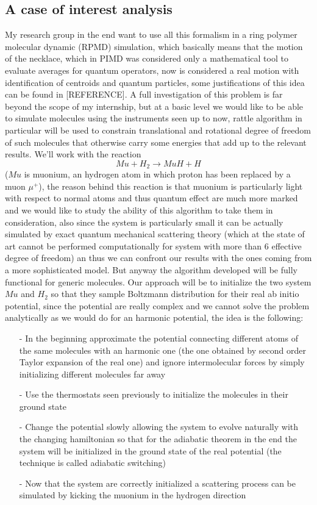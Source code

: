 \documentclass[10pt,a4paper]{article}
\begin{document}
\subsection{A case of interest analysis}
My research group in the end want to use all this formalism in a ring polymer molecular dynamic (RPMD) simulation, which basically means that the motion of the necklace, which in PIMD was considered only a mathematical tool to evaluate averages for quantum operators, now is considered a real motion with identification of centroids and quantum particles, some justifications of this idea can be found in [REFERENCE].
A full investigation of this problem is far beyond the scope of my internship, but at a basic level we would like to be able to simulate molecules using the instruments seen up to now, rattle algorithm in particular will be used to constrain translational and rotational degree of freedom of such molecules that otherwise carry some energies that add up to the relevant results.
We'll work with the reaction 
\[Mu + H_2 \rightarrow MuH + H \]
($Mu$ is muonium, an hydrogen atom in which proton has been replaced by a muon $\mu^+$), the reason behind this reaction is that muonium is particularly light with respect to normal atoms and thus quantum effect are much more marked and we would like to study the ability of this algorithm to take them in consideration, also since the system is particularly small it can be actually simulated by exact quantum mechanical scattering theory (which at the state of art cannot be performed computationally for system with more than 6 effective degree of freedom) an thus we can confront our results with the ones coming from a more sophisticated model. But anyway the algorithm developed will be fully functional for generic molecules.
Our approach will be to initialize the two system $Mu$ and $H_2$ so that they sample Boltzmann distribution for their real ab initio potential, since the potential are really complex and we cannot solve the problem analytically as we would do for an harmonic potential, the idea is the following:
\begin{itemize}
	\item[-] In the beginning approximate the potential connecting different atoms of the same molecules with an harmonic one (the one obtained by second order Taylor expansion of the real one) and ignore intermolecular forces by simply initializing different molecules far away
	\item[-] Use the thermostats seen previously to initialize the molecules in their ground state 
	\item[-] Change the potential slowly allowing the system to evolve naturally with the changing hamiltonian so that for the adiabatic theorem in the end the system will be initialized in the ground state of the real potential (the technique is called adiabatic switching)
	\item[-] Now that the system are correctly initialized a scattering process can be simulated by kicking the muonium in the hydrogen direction
\end{itemize}
\end{document}
